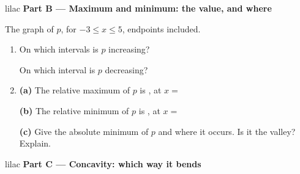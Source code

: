 \documentclass[10pt]{article}
\newcommand{\pcurve}{(-3,-3) .. controls (-2.6,0) and (-1.9,4) .. (-1,4)
  .. controls (1,4) and (1,-2) .. (3,-2) .. controls (3.8,-2) and (4.4,0) .. (5,3)}
\newcommand{\paxes}{%
  \draw[linegray, very thin, step=1] (-4,-4) grid (6,5);
  \draw[->, thick] (-4,0) -- (6.5,0) node[right] {\small $x$};
  \draw[->, thick] (0,-4) -- (0,5.5) node[above] {\small $p(x)$};
  \foreach \x in {-3,-2,-1,1,2,3,4,5} \node[below, font=\scriptsize] at (\x,0) {\x};
  \foreach \y in {-3,-2,-1,1,2,3,4} \node[left, font=\scriptsize] at (0,\y) {\y};}
\begin{document}
\vspace{0.14in}

\begin{headlinebox}{lilac}
\textbf{\color{plum}Part B --- Maximum and minimum: the value, and where}
\end{headlinebox}

\vspace{0.06in}

\noindent\begin{minipage}[t]{0.40\linewidth}
\vspace{0pt}
\centering
{}

{\footnotesize The graph of $p$, for $-3 \le x \le 5$, endpoints included.}
\end{minipage}\hfill
\begin{minipage}[t]{0.57\linewidth}
\vspace{0pt}
\begin{enumerate}[leftmargin=1.9em, itemsep=8pt, start=3]
\item On which intervals is $p$ increasing? \hfill \blank{3.2cm}

      On which interval is $p$ decreasing? \hfill \blank{3.2cm}

\item \textbf{(a)} The relative maximum of $p$ is \blank{1.0cm}, at $x = $ \blank{1.0cm}

      \textbf{(b)} The relative minimum of $p$ is \blank{1.0cm}, at $x = $ \blank{1.0cm}

      \textbf{(c)} Give the absolute minimum of $p$ and where it occurs. Is it the valley?
      Explain.
      \writespace{1.6cm}{}
\end{enumerate}
\end{minipage}

\newpage

\begin{headlinebox}{lilac}
\textbf{\color{plum}Part C --- Concavity: which way it bends}
\end{headlinebox}
\end{document}
